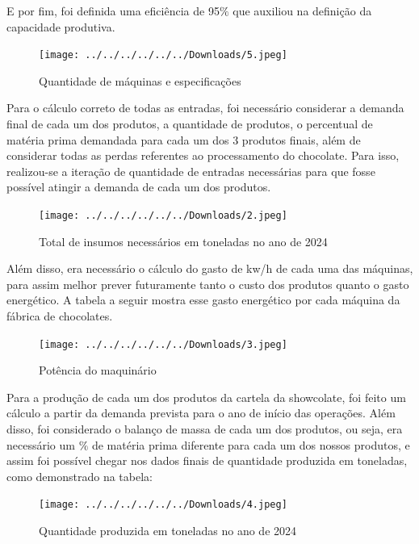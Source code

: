 \documentclass[
	12pt,				%
	openright,			%
	oneside,			%
	a4paper,			%
	english,			%
	french,				%
	spanish,			%
	brazil				%
	]{abntex2}
\begin{document}
E por fim, foi definida uma eficiência de 95$\%$ que auxiliou na definição da capacidade produtiva.

\begin{figure}[H]
\begin{center}
\caption{Quantidade de máquinas e especificações}
\texttt{[image: ../../../../../../Downloads/5.jpeg]} 
\end{center}
\end{figure}

Para o cálculo correto de todas as entradas, foi necessário considerar a demanda final de cada um dos produtos, a quantidade de produtos, o percentual de matéria prima demandada para cada um dos 3 produtos finais, além de considerar todas as perdas referentes ao processamento do chocolate. Para isso, realizou-se a iteração de quantidade de entradas necessárias para que fosse possível atingir a demanda de cada um dos produtos.

\begin{figure}[H]
\begin{center}
\caption{Total de insumos necessários em toneladas no ano de 2024}
\texttt{[image: ../../../../../../Downloads/2.jpeg]} 
\end{center}
\end{figure}

Além disso, era necessário o cálculo do gasto de kw/h de cada uma das máquinas, para assim melhor prever futuramente tanto o custo dos produtos quanto o gasto energético. A tabela a seguir mostra esse gasto energético por cada máquina da fábrica de chocolates.

\begin{figure}[H]
\begin{center}
\caption{Potência do maquinário}
\texttt{[image: ../../../../../../Downloads/3.jpeg]} 
\end{center}
\end{figure}

Para a produção de cada um dos produtos da cartela da showcolate, foi feito um cálculo a partir da demanda prevista para o ano de início das operações. Além disso, foi considerado o balanço de massa de cada um dos produtos, ou seja, era necessário um $\%$ de matéria prima diferente para cada um dos nossos produtos, e assim foi possível chegar nos dados finais de quantidade produzida em toneladas, como demonstrado na tabela:

\begin{figure}[H]
\begin{center}
\caption{Quantidade produzida em toneladas no ano de 2024}
\texttt{[image: ../../../../../../Downloads/4.jpeg]} 
\end{center}
\end{figure}
\end{document}
